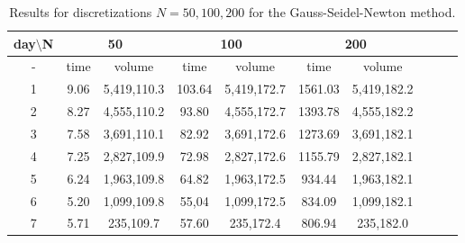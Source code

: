 \documentclass[11pt]{article}
\begin{document}
\begin{table}[h!]
\centering
    \begin{tabular}{|c|c|c|c|c|c|c|c|c|c|} 
    \hline
        day$\setminus$N & \multicolumn{2}{|c|}{50} & \multicolumn{2}{|c|}{100} & \multicolumn{2}{|c|}{200} \\ \hline
        -      %
        & time & volume %
        & time & volume %
        & time & volume \\ \hline
        1         %
        & 9.06 & 5,419,110.3 %
        & 103.64 & 5,419,172.7 %
        & 1561.03 & 5,419,182.2 \\
        2         %
        & 8.27 & 4,555,110.2 %
        & 93.80 & 4,555,172.7 %
        & 1393.78 & 4,555,182.2 \\
        3         %
        & 7.58 & 3,691,110.1 %
        & 82.92 & 3,691,172.6 %
        & 1273.69 & 3,691,182.1   \\
				4         %
        & 7.25 & 2,827,109.9 %
        & 72.98 & 2,827,172.6 %
        & 1155.79 & 2,827,182.1   \\
				5         %
        & 6.24 & 1,963,109.8 %
        & 64.82 & 1,963,172.5 %
        & 934.44 & 1,963,182.1   \\
				6         %
        & 5.20 & 1,099,109.8 %
        & 55,04 & 1,099,172.5 %
        & 834.09 & 1,099,182.1   \\
				7         %
        & 5.71 & 235,109.7 %
        & 57.60 & 235,172.4 %
        & 806.94 & 235,182.0   \\
    \hline
    \end{tabular}
    \caption{Results for discretizations $N=50, 100, 200$ for the Gauss-Seidel-Newton method. %
    }
		\label{tab:BrugnaroExpResults}
 \end{table}
\end{document}
